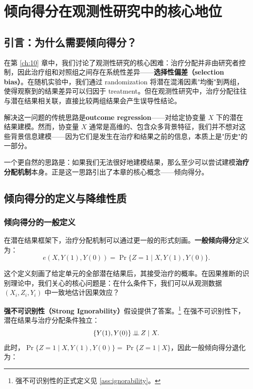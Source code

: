 
\chapter{倾向得分在观测性研究中的核心地位}\label{ch:11}

\section{引言：为什么需要倾向得分？}\label{sec:11-intro}

在第 \ref{ch:10} 章中，我们讨论了观测性研究的核心困难：治疗分配并非由研究者控制，因此治疗组和对照组之间存在系统性差异——\textbf{选择性偏差（selection bias）}。在随机实验中，我们通过 randomization 将潜在混淆因素"均衡"到两组，使得观察到的结果差异可以归因于 treatment。但在观测性研究中，治疗分配往往与潜在结果相关联，直接比较两组结果会产生误导性结论。

解决这一问题的传统思路是\textbf{outcome regression}——对给定协变量 $X$ 下的潜在结果建模。然而，协变量 $X$ 通常是高维的、包含众多背景特征，我们并不想对这些背景信息建模——因为它们是发生在治疗和结果之前的信息，本质上是"历史"的一部分。

一个更自然的思路是：如果我们无法很好地建模结果，那么至少可以尝试建模\textbf{治疗分配机制}本身。正是这一思路引出了本章的核心概念——倾向得分。

\section{倾向得分的定义与降维性质}\label{sec:11-propensity-score}

\subsection{倾向得分的一般定义}\label{sec:11-general-ps}

在潜在结果框架下，治疗分配机制可以通过更一般的形式刻画。\textbf{一般倾向得分}定义为：
\[
e(X, Y(1), Y(0)) = \Pr\{Z = 1 \mid X, Y(1), Y(0)\}.
\tag{11.1}
\]

这个定义刻画了给定单元的全部潜在结果后，其接受治疗的概率。在因果推断的识别理论中，我们关心的核心问题是：在什么条件下，我们可以从观测数据 $(X_i, Z_i, Y_i)$ 中一致地估计因果效应？

\textbf{强不可识别性（Strong Ignorability）}假设提供了答案。\footnote{强不可识别性的正式定义见 \cref{ass:ignorability}。} 在强不可识别性下，潜在结果与治疗分配条件独立：
\[
\{Y(1), Y(0)\} \operatorname{\mathrel{\perp\!\!\!\perp}} Z \mid X.
\]
此时，$\Pr\{Z = 1 \mid X, Y(1), Y(0)\} = \Pr\{Z = 1 \mid X\}$，因此一般倾向得分退化为：

